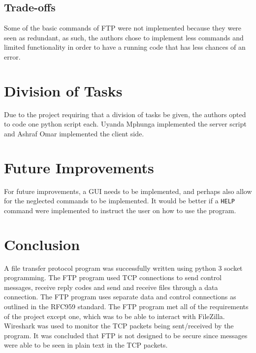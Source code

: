 \documentclass[journal, a4paper]{IEEEtran}
\begin{document}
\subsection{Trade-offs}
Some of the basic commands of FTP were not implemented because they were seen as redundant, as such, the authors chose to implement less commands and limited functionality in order to have a running code that has less chances of an error.

\section{Division of Tasks}

Due to the project requiring that a division of tasks be given, the authors opted to code one python script each. Uyanda Mphunga implemented the server script and Ashraf Omar implemented the client side.

\section{Future Improvements}

For future improvements, a GUI needs to be implemented, and perhaps also allow for the neglected commands to be implemented. It would be better if a \texttt{HELP} command were implemented to instruct the user on how to use the program.

\section{Conclusion}
A file transfer protocol program was successfully written using python 3 socket programming. The FTP program used TCP connections to send control messages, receive reply codes and send and receive files through a data connection. The FTP program uses separate data and control connections as outlined in the RFC959 standard. The FTP program met all of the requirements of the project except one, which was to be able to interact with FileZilla. Wireshark was used to monitor the TCP packets being sent/received by the program. It was concluded that FTP is not designed to be secure since messages were able to be seen in plain text in the TCP packets.
%
\onecolumn


\newpage
\appendix
\end{document}
